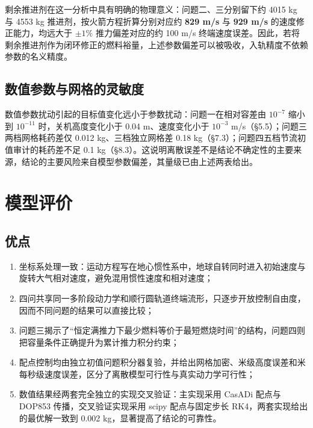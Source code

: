 \documentclass[withoutpreface,bwprint]{cumcmthesis}
\begin{document}
剩余推进剂在这一分析中具有明确的物理意义：问题二、三分别留下约 4015 kg 与 4553 kg 推进剂，按火箭方程折算分别对应约 \textbf{829 m/s} 与 \textbf{929 m/s} 的速度修正能力，均远大于 $\pm1\%$ 推力偏差对应的约 100 m/s 终端速度误差。因此，若将剩余推进剂作为闭环修正的燃料裕量，上述参数偏差可以被吸收，入轨精度不依赖参数的名义精度。

\subsection{数值参数与网格的灵敏度}
数值参数扰动引起的目标值变化远小于参数扰动：问题一在相对容差由 $10^{-7}$ 缩小到 $10^{-11}$ 时，关机高度变化小于 0.04 m、速度变化小于 $10^{-3}$ m/s（§5.5）；问题三两档网格耗药差仅 0.012 kg、三档独立网格差 0.18 kg（§7.3）；问题四五档节流初值审计的耗药差不足 0.1 kg（§8.3）。这说明离散误差不是结论不确定性的主要来源，结论的主要风险来自模型参数偏差，其量级已由上述两表给出。

\section{模型评价}

\subsection{优点}
\begin{enumerate}
    \item 坐标系处理一致：运动方程写在地心惯性系中，地球自转同时进入初始速度与旋转大气相对速度，避免混用惯性速度和相对速度；
    \item 四问共享同一多阶段动力学和顺行圆轨道终端流形，只逐步开放控制自由度，因而不同问题的结果可以直接比较；
    \item 问题三揭示了“恒定满推力下最少燃料等价于最短燃烧时间”的结构，问题四则把容量条件正确提升为累计推力积分约束；
    \item 配点控制均由独立初值问题积分器复验，并给出网格加密、米级高度误差和米每秒级速度误差，区分了离散模型可行性与真实动力学可行性；
    \item 数值结果经两套完全独立的实现交叉验证：主实现采用 CasADi 配点与 DOP853 传播，交叉验证实现采用 scipy 配点与固定步长 RK4，两套实现给出的最优解一致到 0.002 kg，显著提高了结论的可靠性。
\end{enumerate}
\end{document}
